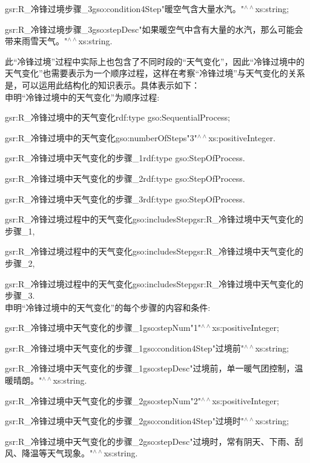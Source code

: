 gsr:R\_冷锋过境步骤\_3\quad gso:condition4Step\quad "暖空气含大量水汽。"$^{\land\land}$xs:string\quad ;

gsr:R\_冷锋过境步骤\_3\quad gso:stepDesc\quad "如果暖空气中含有大量的水汽，那么可能会带来雨雪天气。"$^{\land\land}$xs:string\quad .

此“冷锋过境”过程中实际上也包含了不同时段的“天气变化”，因此“冷锋过境中的天气变化”也需要表示为一个顺序过程，这样在考察“冷锋过境”与天气变化的关系是，可以运用此结构化的知识表示。具体表示如下：
\\
申明“冷锋过境中的天气变化”为顺序过程:

gsr:R\_冷锋过境中的天气变化\quad rdf:type \quad gso:SequentialProcess\quad ;

gsr:R\_冷锋过境中的天气变化\quad gso:numberOfSteps\quad "3"$^{\land\land}$xs:positiveInteger\quad .

gsr:R\_冷锋过境中天气变化的步骤\_1\quad rdf:type \quad gso:StepOfProcess\quad .

gsr:R\_冷锋过境中天气变化的步骤\_2\quad rdf:type \quad gso:StepOfProcess\quad .

gsr:R\_冷锋过境中天气变化的步骤\_3\quad rdf:type \quad gso:StepOfProcess\quad .

gsr:R\_冷锋过境过程中的天气变化\quad gso:includesStep\quad gsr:R\_冷锋过境中天气变化的步骤\_1\quad ,\quad 

gsr:R\_冷锋过境过程中的天气变化\quad gso:includesStep\quad gsr:R\_冷锋过境中天气变化的步骤\_2\quad ,\quad 

gsr:R\_冷锋过境过程中的天气变化\quad gso:includesStep\quad gsr:R\_冷锋过境中天气变化的步骤\_3\quad .
\\
申明“冷锋过境中的天气变化”的每个步骤的内容和条件:

gsr:R\_冷锋过境中天气变化的步骤\_1\quad gso:stepNum\quad "1"$^{\land\land}$xs:positiveInteger\quad ;

gsr:R\_冷锋过境中天气变化的步骤\_1\quad gso:condition4Step\quad "过境前"$^{\land\land}$xs:string\quad ;

gsr:R\_冷锋过境中天气变化的步骤\_1\quad gso:stepDesc\quad "过境前，单一暖气团控制，温暖晴朗。"$^{\land\land}$xs:string\quad .

gsr:R\_冷锋过境中天气变化的步骤\_2\quad gso:stepNum\quad "2"$^{\land\land}$xs:positiveInteger\quad ;

gsr:R\_冷锋过境中天气变化的步骤\_2\quad gso:condition4Step\quad "过境时"$^{\land\land}$xs:string\quad ;

gsr:R\_冷锋过境中天气变化的步骤\_2\quad gso:stepDesc\quad "过境时，常有阴天、下雨、刮风、降温等天气现象。"$^{\land\land}$xs:string\quad .

